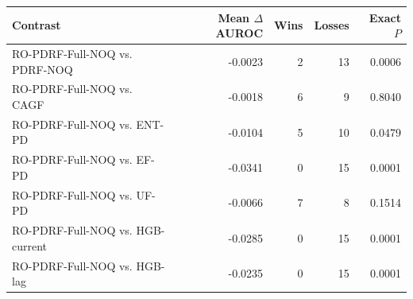 \begin{tabular}{lrrrr}
\toprule
Contrast & Mean $\Delta$ AUROC & Wins & Losses & Exact $P$ \\
\midrule
RO-PDRF-Full-NOQ vs. PDRF-NOQ & -0.0023 & 2 & 13 & 0.0006 \\
RO-PDRF-Full-NOQ vs. CAGF & -0.0018 & 6 & 9 & 0.8040 \\
RO-PDRF-Full-NOQ vs. ENT-PD & -0.0104 & 5 & 10 & 0.0479 \\
RO-PDRF-Full-NOQ vs. EF-PD & -0.0341 & 0 & 15 & 0.0001 \\
RO-PDRF-Full-NOQ vs. UF-PD & -0.0066 & 7 & 8 & 0.1514 \\
RO-PDRF-Full-NOQ vs. HGB-current & -0.0285 & 0 & 15 & 0.0001 \\
RO-PDRF-Full-NOQ vs. HGB-lag & -0.0235 & 0 & 15 & 0.0001 \\
\bottomrule
\end{tabular}

